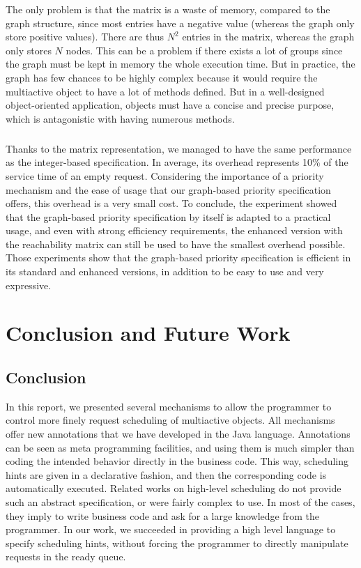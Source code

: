 \documentclass[11pt]{report}
\begin{document}
The only problem is that the matrix is a waste of memory, compared to the graph structure, since most entries have a negative value (whereas the graph only store positive values). There are thus $N^2$ entries in the matrix, whereas the graph only stores $N$ nodes. This can be a problem if there exists a lot of groups since the graph must be kept in memory the whole execution time.
But in practice, the graph has few chances to be highly complex because it would require the multiactive object to have a lot of methods defined. But in a well-designed object-oriented application, objects must have a concise and precise purpose, which is antagonistic with having numerous methods. 

\paragraph{}
Thanks to the matrix representation, we managed to have the same performance as the integer-based specification. In average, its overhead represents 10\% of the service time of an empty request. Considering the importance of a priority mechanism and the ease of usage that our graph-based priority specification offers, this overhead is a very small cost. 
To conclude, the experiment showed that the graph-based priority specification by itself is adapted to a practical usage, and even with strong efficiency requirements, the enhanced version with the reachability matrix can still be used to have the smallest overhead possible. Those experiments show that the graph-based priority specification is efficient in its standard and enhanced versions, in addition to be easy to use and very expressive. 

\chapter{Conclusion and Future Work} 
\section{Conclusion}
In this report, we presented several mechanisms to allow the programmer to control more finely request scheduling of multiactive objects. All mechanisms offer new annotations that we have developed in the Java language. Annotations can be seen as meta programming facilities, and using them is much simpler than coding the intended behavior directly in the business code. This way, scheduling hints are given in a declarative fashion, and then the corresponding code is automatically executed. Related works on high-level scheduling do not provide such an abstract specification, or were fairly complex to use. In most of the cases, they imply to write business code and ask for a large knowledge from the programmer. In our work, we succeeded in providing a high level language to specify scheduling hints, without forcing the programmer to directly manipulate requests in the ready queue.
\end{document}
